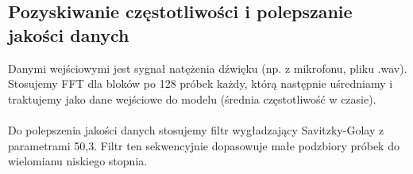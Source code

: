 \documentclass{article}
\begin{document}
\subsection{Pozyskiwanie częstotliwości i polepszanie jakości danych}
Danymi wejściowymi jest sygnał natężenia dźwięku (np. z mikrofonu, pliku .wav).
Stosujemy FFT dla bloków po 128 próbek każdy, którą następnie uśredniamy i traktujemy jako 
dane wejściowe do modelu (średnia częstotliwość w czasie).\\\\
Do polepszenia jakości danych stosujemy filtr wygładzający Savitzky-Golay z parametrami 50,3.
Filtr ten sekwencyjnie dopasowuje małe podzbiory próbek do wielomianu niskiego stopnia.
\end{document}
